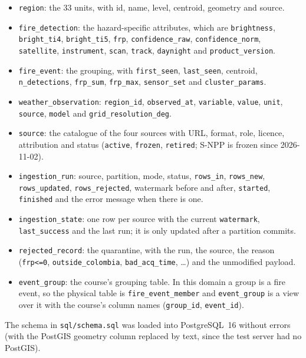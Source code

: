 \documentclass[11pt,a4paper]{article}
\newcommand{\code}[1]{\texttt{\small #1}}
\begin{document}
\begin{itemize}
  \item \code{region}: the 33 units, with id, name, level, centroid, geometry and source.
  \item \code{fire\_detection}: the hazard-specific attributes, which are \code{brightness},
        \code{bright\_ti4}, \code{bright\_ti5}, \code{frp}, \code{confidence\_raw},
        \code{confidence\_norm}, \code{satellite}, \code{instrument}, \code{scan}, \code{track},
        \code{daynight} and \code{product\_version}.
  \item \code{fire\_event}: the grouping, with \code{first\_seen}, \code{last\_seen}, centroid,
        \code{n\_detections}, \code{frp\_sum}, \code{frp\_max}, \code{sensor\_set} and
        \code{cluster\_params}.
  \item \code{weather\_observation}: \code{region\_id}, \code{observed\_at}, \code{variable},
        \code{value}, \code{unit}, \code{source}, \code{model} and \code{grid\_resolution\_deg}.
  \item \code{source}: the catalogue of the four sources with URL, format, role, licence,
        attribution and status (\code{active}, \code{frozen}, \code{retired}; S-NPP is frozen since
        2026-11-02).
  \item \code{ingestion\_run}: source, partition, mode, status, \code{rows\_in}, \code{rows\_new},
        \code{rows\_updated}, \code{rows\_rejected}, watermark before and after, \code{started},
        \code{finished} and the error message when there is one.
  \item \code{ingestion\_state}: one row per source with the current \code{watermark},
        \code{last\_success} and the last run; it is only updated after a partition commits.
  \item \code{rejected\_record}: the quarantine, with the run, the source, the reason
        (\code{frp<=0}, \code{outside\_colombia}, \code{bad\_acq\_time}, \ldots) and the unmodified
        payload.
  \item \code{event\_group}: the course's grouping table. In this domain a group is a fire event, so
        the physical table is \code{fire\_event\_member} and \code{event\_group} is a view over it
        with the course's column names (\code{group\_id}, \code{event\_id}).
\end{itemize}

The schema in \code{sql/schema.sql} was loaded into PostgreSQL~16 without errors (with the PostGIS
geometry column replaced by text, since the test server had no PostGIS).
\end{document}
